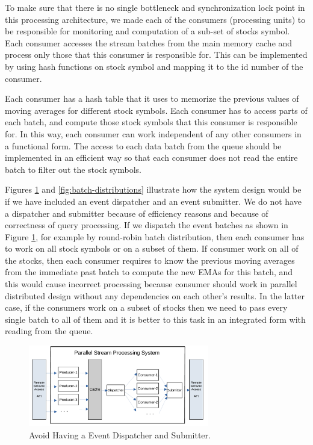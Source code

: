 To make sure that there is no single bottleneck and synchronization lock point in this processing architecture, we made each of the consumers
(processing units) to be responsible for monitoring and computation of a sub-set of stocks symbol. Each consumer accesses the stream batches from 
the main memory cache and process only those that this consumer is responsible for. This can be implemented by using hash functions on 
stock symbol and mapping it to the id number of the consumer. 

Each consumer has a hash table that it uses to memorize the previous values of moving averages for different stock symbols.  
Each consumer has to access parts of each batch, and compute those stock symbols that this consumer is responsible for. In this way, each consumer can work 
independent of any other consumers in a functional form. The access to each data batch from the queue should be implemented in an efficient way so that each 
consumer does not read the entire batch to filter out the stock symbols. 



Figures \ref{fig:parallel-srream-processing} and \ref{fig:batch-distributions} illustrate how the system design would be if we have included an event dispatcher
and an event submitter. We do not have a dispatcher and submitter because of efficiency reasons and because of correctness of query processing. 
If we dispatch the event batches as shown in Figure \ref{fig:parallel-srream-processing}, for example by round-robin batch distribution, then each 
consumer has to work on all stock symbols or on a subset of them. If consumer work on all of the stocks, then each consumer requires to know the previous 
moving averages from the immediate past batch to compute the new EMAs for this batch, and this would cause incorrect processing because 
consumer should work in parallel distributed design without any dependencies on each other's results. In the latter case, if the consumers 
work on a subset of stocks then we need to pass every single batch to all of them and it is better 
to this task in an integrated form with reading from the queue.



\begin{figure}[]
    \begin{center}
        \includegraphics[width=0.7\textwidth]{./images/Parallel-Stream-Processing-System}
        \caption{Avoid Having a Event Dispatcher and Submitter.}
        \label{fig:parallel-srream-processing}
    \end{center}
\end{figure}


